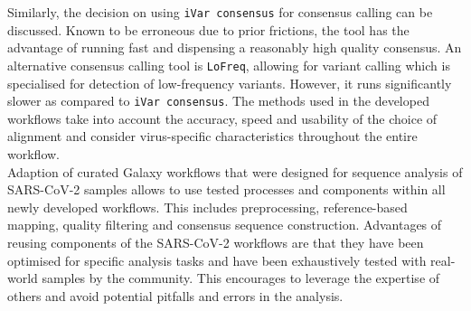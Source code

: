 Similarly, the decision on using \texttt{iVar consensus} for consensus calling can be discussed. Known to be erroneous due to prior frictions, the tool has the advantage of running fast and dispensing a reasonably high quality consensus. An alternative consensus calling tool is \texttt{LoFreq}, allowing for variant calling which is specialised for detection of low-frequency variants. However, it runs significantly slower as compared to \texttt{iVar consensus}. The methods used in the developed workflows take into account the accuracy, speed and usability of the choice of alignment and consider virus-specific characteristics throughout the entire workflow.\\
Adaption of curated Galaxy workflows that were designed for sequence analysis of \ac{SARS-CoV-2} samples allows to use tested processes and components within all newly developed workflows. This includes preprocessing, reference-based mapping, quality filtering and consensus sequence construction. Advantages of reusing components of the \ac{SARS-CoV-2} workflows are that they have been optimised for specific analysis tasks and have been exhaustively tested with real-world samples by the community. This encourages to leverage the expertise of others and avoid potential pitfalls and errors in the analysis.


